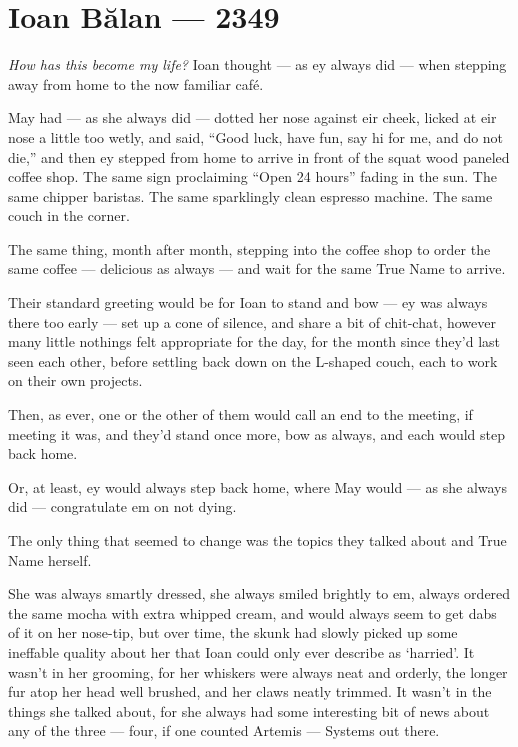 \hypertarget{ioan-bux103lan-2349}{%
\chapter{Ioan Bălan — 2349}\label{ioan-bux103lan-2349}}

\emph{How has this become my life?} Ioan thought — as ey always did — when stepping away from home to the now familiar café.

May had — as she always did — dotted her nose against eir cheek, licked at eir nose a little too wetly, and said, ``Good luck, have fun, say hi for me, and do not die,'' and then ey stepped from home to arrive in front of the squat wood paneled coffee shop. The same sign proclaiming ``Open 24 hours'' fading in the sun. The same chipper baristas. The same sparklingly clean espresso machine. The same couch in the corner.

The same thing, month after month, stepping into the coffee shop to order the same coffee — delicious as always — and wait for the same True Name to arrive.

Their standard greeting would be for Ioan to stand and bow — ey was always there too early — set up a cone of silence, and share a bit of chit-chat, however many little nothings felt appropriate for the day, for the month since they'd last seen each other, before settling back down on the L-shaped couch, each to work on their own projects.

Then, as ever, one or the other of them would call an end to the meeting, if meeting it was, and they'd stand once more, bow as always, and each would step back home.

Or, at least, ey would always step back home, where May would — as she always did — congratulate em on not dying.

The only thing that seemed to change was the topics they talked about and True Name herself.

She was always smartly dressed, she always smiled brightly to em, always ordered the same mocha with extra whipped cream, and would always seem to get dabs of it on her nose-tip, but over time, the skunk had slowly picked up some ineffable quality about her that Ioan could only ever describe as `harried'. It wasn't in her grooming, for her whiskers were always neat and orderly, the longer fur atop her head well brushed, and her claws neatly trimmed. It wasn't in the things she talked about, for she always had some interesting bit of news about any of the three — four, if one counted Artemis — Systems out there.

